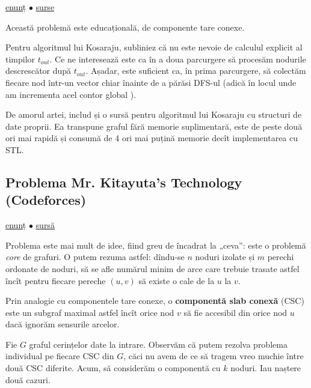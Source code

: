 \documentclass[../main.tex]{subfiles}
\begin{document}
\href{https://infoarena.ro/problema/ctc}{enunț}
$\bullet$
\hyperref[code:ctc]{surse}

Această problemă este educațională, de componente tare conexe.

Pentru algoritmul lui Kosaraju, subliniez că nu este nevoie de calculul explicit al timpilor $t_{out}$. Ce ne interesează este ca în a doua parcurgere să procesăm nodurile descrescător după $t_{out}$. Așadar, este suficient ca, în prima parcurgere, să colectăm fiecare nod într-un vector chiar înainte de a părăsi DFS-ul (adică în locul unde am incrementa acel contor global ).

De amorul artei, includ și o sursă pentru algoritmul lui Kosaraju cu structuri de date proprii. Ea transpune graful fără memorie suplimentară, este de peste două ori mai rapidă și consumă de 4 ori mai puțină memorie decît implementarea cu STL.

\subsection{Problema Mr. Kitayuta's Technology (Codeforces)}
\label{problem:mr-kitayuta-s-technology}

\href{https://codeforces.com/contest/505/problem/D}{enunț}
$\bullet$
\hyperref[code:mr-kitayuta-s-technology]{sursă}

Problema este mai mult de idee, fiind greu de încadrat la „ceva”: este o problemă \textit{core} de grafuri. O putem rezuma astfel: dîndu-se $n$ noduri izolate și $m$ perechi ordonate de noduri, să se afle numărul minim de arce care trebuie trasate astfel încît pentru fiecare pereche $(u,v)$ să existe o cale de la $u$ la $v$.

Prin analogie cu componentele tare conexe, o \textbf{componentă slab conexă} (CSC) este un subgraf maximal astfel încît orice nod $v$ să fie accesibil din orice nod $u$ dacă ignorăm sensurile arcelor.

Fie $G$ graful cerințelor date la intrare. Observăm că putem rezolva problema individual pe fiecare CSC din $G$, căci nu avem de ce să tragem vreo muchie între două CSC diferite. Acum, să considerăm o componentă cu $k$ noduri. Iau naștere două cazuri.
\end{document}
